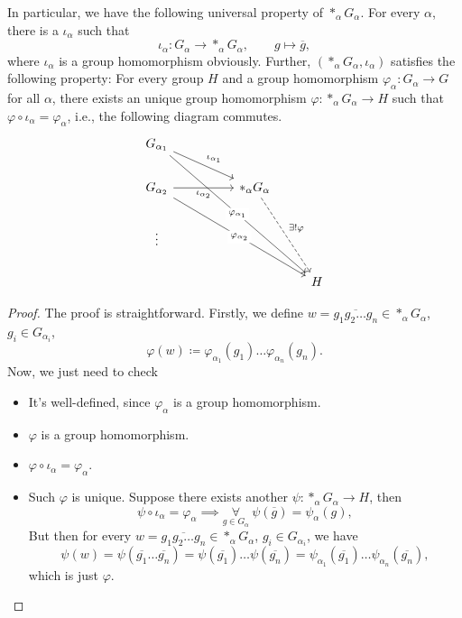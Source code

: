 \begin{remark}
	In particular, we have the following universal property of \(\ast_\alpha G_\alpha \). For every \(\alpha \), there is a \(\iota _\alpha \) such that
	\[
		\iota _\alpha \colon G_\alpha \to \ast_\alpha G_\alpha ,\qquad g\mapsto \overline{g},
	\]
	where \(\iota _\alpha \) is a group homomorphism obviously. Further, \((\ast_\alpha G_\alpha ,\iota _\alpha )\) satisfies the following property: For every
	group \(H\) and a group homomorphism \(\varphi _\alpha \colon G_\alpha \to G\) for all \(\alpha \), there exists an unique group homomorphism \(\varphi \colon \ast_\alpha G_\alpha \to H\)
	such that \(\varphi \circ \iota _\alpha = \varphi _\alpha \), i.e., the following diagram commutes.
	\[
		\begin{tikzcd}
			{G_{\alpha_1}} \\
			{G_{\alpha_2}} && {\ast_\alpha G_\alpha} \\
			\vdots \\
			&&& H
			\arrow["{\iota_{\alpha_1}}", from=1-1, to=2-3]
			\arrow["{\iota_{\alpha_2}}"', from=2-1, to=2-3]
			\arrow["{\exists ! \varphi}", dashed, from=2-3, to=4-4]
			\arrow["{\varphi_{\alpha_1}}"{description}, from=1-1, to=4-4]
			\arrow["{\varphi_{\alpha_2}}"{description}, from=2-1, to=4-4]
		\end{tikzcd}
	\]
	\begin{proof}
		The proof is straightforward. Firstly, we define \(w = \overline{g_1 g_2\ldots g_n}\in \ast_\alpha G_\alpha\), \(g_{i} \in G_{\alpha_{i} } \),
		\[
			\varphi (w)\coloneqq \varphi _{\alpha _1}(g_1)\ldots \varphi _{\alpha _{n} }(g_{n} ).
		\]
		Now, we just need to check
		\begin{itemize}
			\item It's well-defined, since \(\varphi_\alpha \) is a group homomorphism.
			\item \(\varphi \) is a group homomorphism.
			\item \(\varphi \circ \iota _\alpha =\varphi _\alpha \).
			\item Such \(\varphi \) is unique. Suppose there exists another \(\psi \colon \ast_\alpha G_\alpha \to H\), then
			      \[
				      \psi \circ \iota _\alpha = \varphi _\alpha \implies \underset{g\in G_\alpha }{\forall }\ \psi (\overline{g} )= \psi _\alpha (g),
			      \]
			      But then for every \(w = \overline{g_1 g_2\ldots g_n}\in \ast_\alpha G_\alpha\), \(g_{i} \in G_{\alpha_{i} } \), we have
			      \[
				      \psi (w) = \psi (\overline{g_1}\ldots \overline{g_n}) = \psi (\overline{g_1}) \ldots \psi (\overline{g_n})  = \psi _{\alpha _1}(\overline{g_1}) \ldots \psi _{\alpha_n}(\overline{g_n}),
			      \]
			      which is just \(\varphi \).
		\end{itemize}
	\end{proof}
\end{remark}
